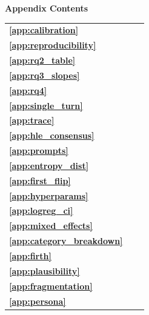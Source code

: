 \clearpage
\onecolumn
\begin{center}
{\LARGE\textbf{Appendix Contents}}
\end{center}
\vspace{1.5em}
\begin{center}
{\large
\renewcommand{\arraystretch}{2.0}
\begin{tabular}{@{}p{} p{} r@{}}
\textbf{\ref{app:calibration}} & \nameref{app:calibration} & \pageref{app:calibration} \\
\textbf{\ref{app:reproducibility}} & \nameref{app:reproducibility} & \pageref{app:reproducibility} \\
\textbf{\ref{app:rq2_table}} & \nameref{app:rq2_table} & \pageref{app:rq2_table} \\
\textbf{\ref{app:rq3_slopes}} & \nameref{app:rq3_slopes} & \pageref{app:rq3_slopes} \\
\textbf{\ref{app:rq4}} & \nameref{app:rq4} & \pageref{app:rq4} \\
\textbf{\ref{app:single_turn}} & \nameref{app:single_turn} & \pageref{app:single_turn} \\
\textbf{\ref{app:trace}} & \nameref{app:trace} & \pageref{app:trace} \\
\textbf{\ref{app:hle_consensus}} & \nameref{app:hle_consensus} & \pageref{app:hle_consensus} \\
\textbf{\ref{app:prompts}} & \nameref{app:prompts} & \pageref{app:prompts} \\
\textbf{\ref{app:entropy_dist}} & \nameref{app:entropy_dist} & \pageref{app:entropy_dist} \\
\textbf{\ref{app:first_flip}} & \nameref{app:first_flip} & \pageref{app:first_flip} \\
\textbf{\ref{app:hyperparams}} & \nameref{app:hyperparams} & \pageref{app:hyperparams} \\
\textbf{\ref{app:logreg_ci}} & \nameref{app:logreg_ci} & \pageref{app:logreg_ci} \\
\textbf{\ref{app:mixed_effects}} & \nameref{app:mixed_effects} & \pageref{app:mixed_effects} \\
\textbf{\ref{app:category_breakdown}} & \nameref{app:category_breakdown} & \pageref{app:category_breakdown} \\
\textbf{\ref{app:firth}} & \nameref{app:firth} & \pageref{app:firth} \\
\textbf{\ref{app:plausibility}} & \nameref{app:plausibility} & \pageref{app:plausibility} \\
\textbf{\ref{app:fragmentation}} & \nameref{app:fragmentation} & \pageref{app:fragmentation} \\
\textbf{\ref{app:persona}} & \nameref{app:persona} & \pageref{app:persona} \\
\end{tabular}
}
\end{center}
\vfill
\clearpage
\twocolumn

